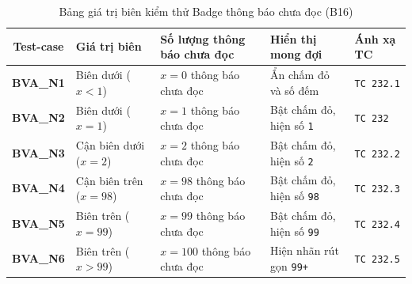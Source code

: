 \documentclass[11pt,a4paper]{article}
\begin{document}
\begin{table}[H]
\centering
\small
\begin{tabularx}{\textwidth}{|c|C{2.9cm}|X|C{3.1cm}|C{2.3cm}|}
\hline
{}
\textbf{Test-case} & \textbf{Giá trị biên} & \textbf{Số lượng thông báo chưa đọc} & \textbf{Hiển thị mong đợi} & \textbf{Ánh xạ TC} \tabularnewline
\hline
\textbf{BVA\_N1} & Biên dưới ($x < 1$) & $x = 0$ thông báo chưa đọc & Ẩn chấm đỏ và số đếm & \texttt{TC 232.1} \\ \hline
\textbf{BVA\_N2} & Biên dưới ($x = 1$) & $x = 1$ thông báo chưa đọc & Bật chấm đỏ, hiện số \texttt{1} & \texttt{TC 232} \\ \hline
\textbf{BVA\_N3} & Cận biên dưới ($x = 2$) & $x = 2$ thông báo chưa đọc & Bật chấm đỏ, hiện số \texttt{2} & \texttt{TC 232.2} \\ \hline
\textbf{BVA\_N4} & Cận biên trên ($x = 98$) & $x = 98$ thông báo chưa đọc & Bật chấm đỏ, hiện số \texttt{98} & \texttt{TC 232.3} \\ \hline
\textbf{BVA\_N5} & Biên trên ($x = 99$) & $x = 99$ thông báo chưa đọc & Bật chấm đỏ, hiện số \texttt{99} & \texttt{TC 232.4} \\ \hline
\textbf{BVA\_N6} & Biên trên ($x > 99$) & $x = 100$ thông báo chưa đọc & Hiện nhãn rút gọn \texttt{99+} & \texttt{TC 232.5} \\ \hline
\end{tabularx}
\caption{Bảng giá trị biên kiểm thử Badge thông báo chưa đọc (B16)}
\end{table}
\end{document}
